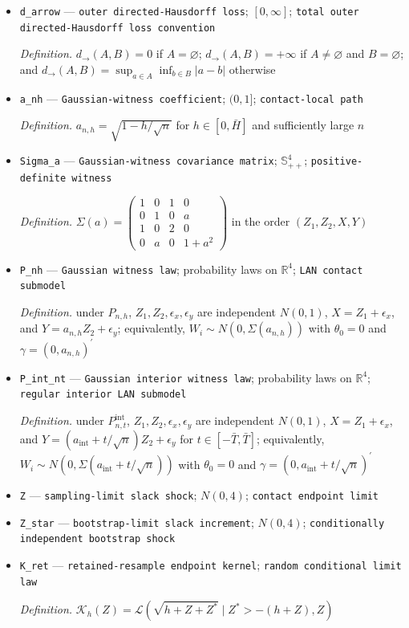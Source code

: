 \documentclass{article}
\begin{document}
\begin{itemize}
  \item \texttt{d\_\allowbreak{}arrow} --- \texttt{outer directed-\allowbreak{}Hausdorff loss}; \([0,\infty]\); \texttt{total outer directed-\allowbreak{}Hausdorff loss convention}
  \par\smallskip\noindent\emph{Definition.} \(d_{\to}(A,B)=0\) if \(A=\varnothing\); \(d_{\to}(A,B)=+\infty\) if \(A\neq\varnothing\) and \(B=\varnothing\); and \(d_{\to}(A,B)=\sup_{a\in A}\inf_{b\in B}|a-b|\) otherwise
  \item \texttt{a\_\allowbreak{}nh} --- \texttt{Gaussian-\allowbreak{}witness coefficient}; \((0,1]\); \texttt{contact-\allowbreak{}local path}
  \par\smallskip\noindent\emph{Definition.} \(a_{n,h}=\sqrt{1-h/\sqrt n}\) for \(h\in[0,\bar H]\) and sufficiently large \(n\)
  \item \texttt{Sigma\_\allowbreak{}a} --- \texttt{Gaussian-\allowbreak{}witness covariance matrix}; \(\mathbb S_{++}^{4}\); \texttt{positive-\allowbreak{}definite witness}
  \par\smallskip\noindent\emph{Definition.} \(\Sigma(a)=\begin{pmatrix}1&0&1&0\\0&1&0&a\\1&0&2&0\\0&a&0&1+a^2\end{pmatrix}\) in the order \((Z_1,Z_2,X,Y)\)
  \item \texttt{P\_\allowbreak{}nh} --- \texttt{Gaussian witness law}; probability laws on \(\mathbb R^4\); \texttt{LAN contact submodel}
  \par\smallskip\noindent\emph{Definition.} under \(P_{n,h}\), \(Z_1,Z_2,\epsilon_x,\epsilon_y\) are independent \(N(0,1)\), \(X=Z_1+\epsilon_x\), and \(Y=a_{n,h}Z_2+\epsilon_y\); equivalently, \(W_i\sim N(0,\Sigma(a_{n,h}))\) with \(\theta_0=0\) and \(\gamma=(0,a_{n,h})^{\prime}\)
  \item \texttt{P\_\allowbreak{}int\_\allowbreak{}nt} --- \texttt{Gaussian interior witness law}; probability laws on \(\mathbb R^4\); \texttt{regular interior LAN submodel}
  \par\smallskip\noindent\emph{Definition.} under \(P_{n,t}^{\mathrm{int}}\), \(Z_1,Z_2,\epsilon_x,\epsilon_y\) are independent \(N(0,1)\), \(X=Z_1+\epsilon_x\), and \(Y=(a_{\mathrm{int}}+t/\sqrt n)Z_2+\epsilon_y\) for \(t\in[-\bar T,\bar T]\); equivalently, \(W_i\sim N(0,\Sigma(a_{\mathrm{int}}+t/\sqrt n))\) with \(\theta_0=0\) and \(\gamma=(0,a_{\mathrm{int}}+t/\sqrt n)^{\prime}\)
  \item \texttt{Z} --- \texttt{sampling-\allowbreak{}limit slack shock}; \(N(0,4)\); \texttt{contact endpoint limit}
  \item \texttt{Z\_\allowbreak{}star} --- \texttt{bootstrap-\allowbreak{}limit slack increment}; \(N(0,4)\); \texttt{conditionally independent bootstrap shock}
  \item \texttt{K\_\allowbreak{}ret} --- \texttt{retained-\allowbreak{}resample endpoint kernel}; \texttt{random conditional limit law}
  \par\smallskip\noindent\emph{Definition.} \(\mathcal K_h(Z)=\mathcal L(\sqrt{h+Z+Z^{*}}\mid Z^{*}>-(h+Z),Z)\)
\end{itemize}
\end{document}

